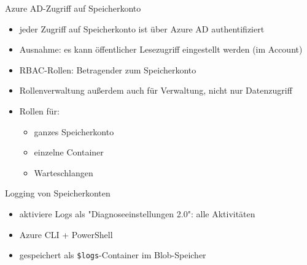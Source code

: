 \begin{flashcard}[Definition]{Azure AD-Zugriff auf Speicherkonto}
    \begin{itemize}
        \item jeder Zugriff auf Speicherkonto ist über Azure AD authentifiziert
        \item Ausnahme: es kann öffentlicher Lesezugriff eingestellt werden (im Account)
        \item RBAC-Rollen: Betragender zum Speicherkonto
        \item Rollenverwaltung außerdem auch für Verwaltung, nicht nur Datenzugriff
        \item Rollen für:
            \begin{itemize}
                \item ganzes Speicherkonto
                \item einzelne Container
                \item Warteschlangen
            \end{itemize}
    \end{itemize}
\end{flashcard}


\begin{flashcard}[Definition]{Logging von Speicherkonten}
    \begin{itemize}
        \item aktiviere Logs als "Diagnoseeinstellungen 2.0": alle Aktivitäten
        \item Azure CLI + PowerShell
        \item gespeichert als \texttt{\$logs}-Container im Blob-Speicher
    \end{itemize}
\end{flashcard}


